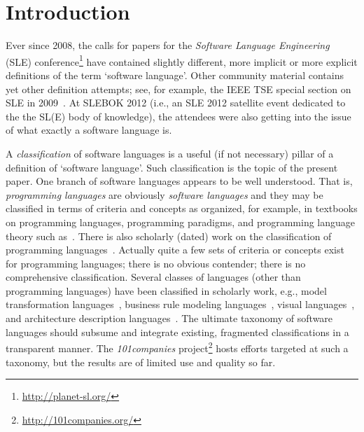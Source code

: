 
\section{Introduction}
\label{S:intro}

\vspace{-27\in}

Ever since 2008, the calls for papers for the \emph{Software Language Engineering} (SLE) conference\footnote{\url{http://planet-sl.org/}} have contained slightly different, more implicit or more explicit definitions of the term `software language'. Other community material contains yet other definition attempts; see, for example, the IEEE TSE special section on SLE in 2009~\cite{FavreGLW09}. At SLEBOK 2012 (i.e., an SLE 2012 satellite event dedicated to the the SL(E) body of knowledge), the attendees were also getting into the issue of what exactly a software language is.

A \emph{classification} of software languages is a useful (if not necessary) pillar of a definition of `software language'. Such classification is the topic of the present paper. One branch of software languages appears to be well understood. That is, \emph{programming languages} are obviously \emph{software languages} and they may be classified in terms of criteria and concepts as organized, for example, in textbooks on programming languages, programming paradigms, and programming language theory such as~\cite{Mosses92,Sebesta12}. There is also scholarly (dated) work on the classification of programming languages~\cite{BabenkoRY75,DoyleS87}. Actually quite a few sets of criteria or concepts exist for programming languages; there is no obvious contender; there is no comprehensive classification. Several classes of languages (other than programming languages) have been classified in scholarly work, e.g., model transformation languages~\cite{CzarneckiH06}, business rule modeling languages~\cite{SkalnaG12}, visual languages~\cite{BottoniG04,BurnettB94,MarriottM97}, and architecture description languages~\cite{MedvidovicT00}. The ultimate taxonomy of software languages should subsume and integrate existing, fragmented classifications in a transparent manner. The \emph{101companies} project\footnote{\url{http://101companies.org/}} hosts efforts targeted at such a taxonomy, but the results are of limited use and quality so far. 

